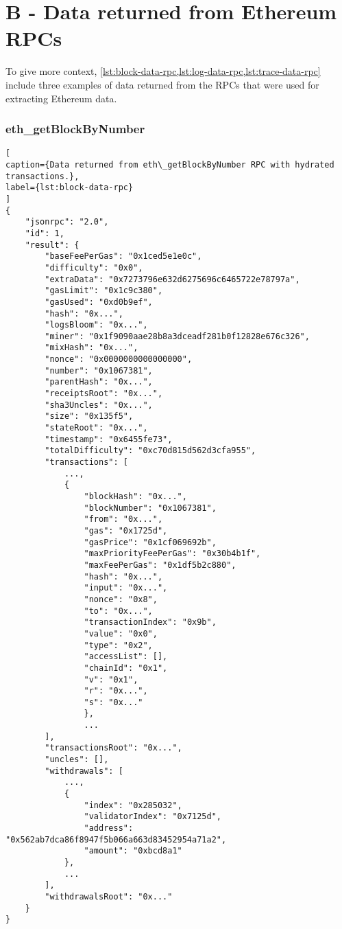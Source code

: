 \chapter*{B - Data returned from Ethereum RPCs}

To give more context, \cref{lst:block-data-rpc,lst:log-data-rpc,lst:trace-data-rpc} include three examples of data returned from the RPCs that were used for extracting Ethereum data.

\subsection*{eth\_getBlockByNumber}

\begin{lstlisting}[
caption={Data returned from eth\_getBlockByNumber RPC with hydrated transactions.},
label={lst:block-data-rpc}
]
{
    "jsonrpc": "2.0",
    "id": 1,
    "result": {
        "baseFeePerGas": "0x1ced5e1e0c",
        "difficulty": "0x0",
        "extraData": "0x7273796e632d6275696c6465722e78797a",
        "gasLimit": "0x1c9c380",
        "gasUsed": "0xd0b9ef",
        "hash": "0x...",
        "logsBloom": "0x...",
        "miner": "0x1f9090aae28b8a3dceadf281b0f12828e676c326",
        "mixHash": "0x...",
        "nonce": "0x0000000000000000",
        "number": "0x1067381",
        "parentHash": "0x...",
        "receiptsRoot": "0x...",
        "sha3Uncles": "0x...",
        "size": "0x135f5",
        "stateRoot": "0x...",
        "timestamp": "0x6455fe73",
        "totalDifficulty": "0xc70d815d562d3cfa955",
        "transactions": [
            ...,
            {
                "blockHash": "0x...",
                "blockNumber": "0x1067381",
                "from": "0x...",
                "gas": "0x1725d",
                "gasPrice": "0x1cf069692b",
                "maxPriorityFeePerGas": "0x30b4b1f",
                "maxFeePerGas": "0x1df5b2c880",
                "hash": "0x...",
                "input": "0x...",
                "nonce": "0x8",
                "to": "0x...",
                "transactionIndex": "0x9b",
                "value": "0x0",
                "type": "0x2",
                "accessList": [],
                "chainId": "0x1",
                "v": "0x1",
                "r": "0x...",
                "s": "0x..."
                },
                ...
        ],
        "transactionsRoot": "0x...",
        "uncles": [],
        "withdrawals": [
            ...,
            {
                "index": "0x285032",
                "validatorIndex": "0x7125d",
                "address": "0x562ab7dca86f8947f5b066a663d83452954a71a2",
                "amount": "0xbcd8a1"
            },
            ...
        ],
        "withdrawalsRoot": "0x..."
    }
}
\end{lstlisting}

